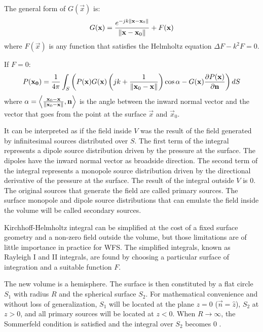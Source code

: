The general form of $G(\vec{x})$ is:
\begin{equation}
G(\mathbf{x}) = \frac{e^{-jk\left\| \mathbf{x} - \mathbf{x}_0 \right\|}}{\left\| \mathbf{x} - \mathbf{x}_0 \right\|} + F(\mathbf{x})
\label{GreensFunction}
\end{equation}
where $F(\vec{x})$ is any function that satisfies the Helmholtz equation $\Delta F - k^2 F = 0$.

If $F = 0$:
\begin{equation}
P(\mathbf{x_0}) = \frac{1}{4\pi} \int_{S} \left(P(\mathbf{x}) G(\mathbf{x})\left(jk + \frac{1}{\left\| \mathbf{x}_0 - \mathbf{x} \right\|}\right)\cos\alpha - G(\mathbf{x}) \frac{\partial P(\mathbf{x})}{\partial \mathbf{n}} \right) dS
\end{equation}
where $\alpha = \left\langle \frac{\mathbf{x}_0 - \mathbf{x}}{\left\| \mathbf{x}_0 - \mathbf{x} \right\|} , \mathbf{n} \right\rangle$ is the angle between the inward normal vector and the vector that goes from the point at the surface $\vec{x}$ and $\vec{x}_0$.

It can be interpreted as if the field inside $V$ was the result of the field generated by infinitesimal sources distributed over $S$. The first term of the integral represents a dipole source distribution driven by the pressure at the surface. The dipoles have the inward normal vector as broadside direction. The second term of the integral represents a monopole source distribution driven by the directional derivative of the pressure at the surface. The result of the integral outside $V$ is $0$. The original sources that generate the field are called primary sources. The surface monopole and dipole source distributions that can emulate the field inside the volume will be called secondary sources.

Kirchhoff-Helmholtz integral can be simplified at the cost of a fixed surface geometry and a non-zero field outside the volume, but those limitations are of little importance in practice for WFS. The simplified integrals, known as Rayleigh I and II integrals, are found by choosing a particular surface of integration and a suitable function $F$.

The new volume is a hemisphere. The surface is then constituted by a flat circle $S_1$ with radius $R$ and the spherical surface $S_2$. For mathematical convenience and without loss of generalization, $S_1$ will be located at the plane $z=0$ ($\vec{n} = \hat{z}$), $S_2$ at $z>0$, and all primary sources will be located at $z<0$. When $R\rightarrow\infty$, the Sommerfeld condition is satisfied and the integral over $S_2$ becomes $0$ \cite{Verheijen}.

